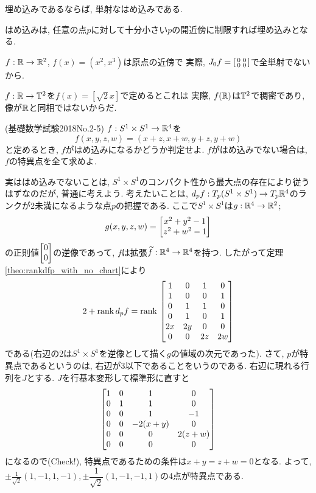 \begin{prop}
\ben
\item 埋め込みであるならば, 単射なはめ込みである.
\item はめ込みは, 任意の点$p$に対して十分小さい$p$の開近傍に制限すれば埋め込みとなる.
\een
\end{prop}


\begin{eg}
\ben
\item $f:\mathbb{R}\to \mathbb{R}^2$, $f(x) = (x^2,x^3)$は原点の近傍で 実際, $J_0 f = \left[\begin{smallmatrix} 0 & 0 \\ 0 & 0\end{smallmatrix}\right]$で全単射でないから.
\item $f:\mathbb{R}\to \mathbb{T}^2$を$f(x) = [\sqrt{2}x]$で定めるとこれは 実際, $f(\mathbb{R})$は$\mathbb{T}^2$で稠密であり, 像が$\mathbb{R}$と同相ではないからだ.
\een
\end{eg}

\begin{egprob} (基礎数学試験2018No.2-5)
$f:S^1\times S^1 \to \mathbb{R}^4$を
\[f(x,y,z,w) = (x+z,x+w,y+z,y+w)\]
と定めるとき, $f$がはめ込みになるかどうか判定せよ. $f$がはめ込みでない場合は, $f$の特異点を全て求めよ.
\end{egprob}
\begin{egans}
実ははめ込みでないことは, $S^1\times S^1$のコンパクト性から最大点の存在により従うはずなのだが, 普通に考えよう. 考えたいことは, $d_{p}f:T_{p}(S^1\times S^1)\to T_{p}\mathbb{R}^4$のランクが2未満になるような点$p$の把握である. ここで$S^1\times S^1$は$g:\mathbb{R}^4\to \mathbb{R}^2$;
\[g(x,y,z,w) = \begin{bmatrix}x^2+y^2-1\\ z^2+w^2-1 \end{bmatrix}\]
の正則値$\begin{bmatrix}0\\ 0\end{bmatrix}$の逆像であって, $f$は拡張$\widetilde{f}: \mathbb{R}^4\to \mathbb{R}^4$を持つ. したがって定理\ref{theo:rankdfp_with_no_chart}により
\[
2+\mathrm{rank}\, d_{p}f = \mathrm{rank}\, \begin{bmatrix}
1 & 0 &1&0\\
1&0&0&1\\
0&1&1&0\\
0&1&0&1\\
2x&2y&0&0\\
0&0&2z&2w
\end{bmatrix}
\]
である(右辺の2は$S^1\times S^1$を逆像として描く$g$の値域の次元であった). さて, $p$が特異点であるというのは, 右辺が3以下であることをいうのである. 右辺に現れる行列を$J$とする. $J$を行基本変形して標準形に直すと
\[
\begin{bmatrix}
1&0&1&0\\
0&1&1&0\\
0&0&1&-1\\
0&0&-2(x+y)&0\\
0&0&0&2(z+w)\\
0&0&0&0
\end{bmatrix}
\]
になるので(Check!), 特異点であるための条件は$x+y = z+w= 0$となる. よって, $\pm \frac{1}{\sqrt{2}}(1,-1,1,-1), \pm\dfrac{1}{\sqrt{2}}(1,-1,-1,1)$の4点が特異点である.
\end{egans}




